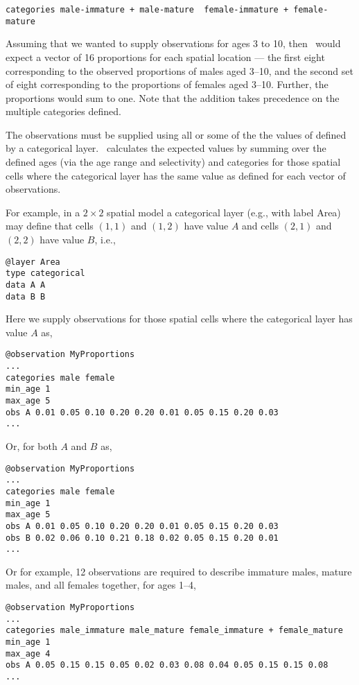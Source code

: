 \begin{verbatim}
categories male-immature + male-mature  female-immature + female-mature
\end{verbatim}

Assuming that we wanted to supply observations for ages 3 to 10, then \SPM\ would expect a vector of 16 proportions for each spatial location --- the first eight corresponding to the observed proportions of males aged 3--10, and the second set of eight corresponding to the proportions of females aged 3--10. Further, the proportions would sum to one. Note that the addition takes precedence on the multiple categories defined. 

The observations must be supplied using all or some of the the values of defined by a categorical layer. \SPM\ calculates the expected values by summing over the defined ages (via the age range and selectivity) and categories for those spatial cells where the categorical layer has the same value as defined for each vector of observations.

For example, in a $2 \times 2$ spatial model a categorical layer (e.g., with label Area) may define that cells $(1,1)$ and $(1,2)$ have value $A$ and cells $(2,1)$ and $(2,2)$ have value $B$, i.e.,

\begin{verbatim}
@layer Area
type categorical
data A A 
data B B
\end{verbatim}

Here we supply observations for those spatial cells where the categorical layer has value $A$ as, 

\begin{verbatim}
@observation MyProportions
...
categories male female
min_age 1
max_age 5
obs A 0.01 0.05 0.10 0.20 0.20 0.01 0.05 0.15 0.20 0.03
...
\end{verbatim}

Or, for both $A$ and $B$ as,

\begin{verbatim}
@observation MyProportions
...
categories male female
min_age 1
max_age 5
obs A 0.01 0.05 0.10 0.20 0.20 0.01 0.05 0.15 0.20 0.03
obs B 0.02 0.06 0.10 0.21 0.18 0.02 0.05 0.15 0.20 0.01
...
\end{verbatim}

Or for example, 12 observations are required to describe immature males, mature males, and all females together, for ages 1--4,

\begin{verbatim}
@observation MyProportions
...
categories male_immature male_mature female_immature + female_mature
min_age 1
max_age 4
obs A 0.05 0.15 0.15 0.05 0.02 0.03 0.08 0.04 0.05 0.15 0.15 0.08
...
\end{verbatim}

